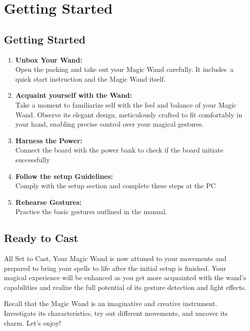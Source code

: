 %
%



\chapter{Getting Started}

\section{Getting Started}

\begin{enumerate}
	
	\item \textbf{Unbox Your Wand:} \\
	Open the packing and take out your Magic Wand carefully. It includes a quick start instruction and the Magic Wand itself.
	\item \textbf{Acquaint yourself with the Wand:}\\
	Take a moment to familiarize self with the feel and balance of your Magic Wand. Observe its elegant design, meticulously crafted to fit comfortably in your hand, enabling precise control over your magical gestures.
	\item \textbf{Harness the Power:}\\
	Connect the board with the power bank to check if the board initiate successfully
	\item \textbf{Follow the setup Guidelines:}\\
	Comply with the setup section and complete these steps at the PC
	\item \textbf{Rehearse Gestures:}\\
	Practice the basic gestures outlined in the manual. 
	
\end{enumerate}

\section{Ready to Cast}

All Set to Cast,
Your Magic Wand is now attuned to your movements and prepared to bring your spells to life after the initial setup is finished. Your magical experience will be enhanced as you get more acquainted with the wand's capabilities and realize the full potential of its gesture detection and light effects.


Recall that the Magic Wand is an imaginative and creative instrument. Investigate its characteristics, try out different movements, and uncover its charm. Let's enjoy!


